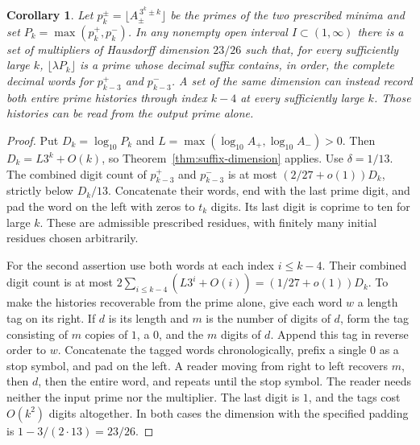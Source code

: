 \documentclass[11pt]{article}
\newtheorem{corollary}[theorem]{Corollary}
\theoremstyle{remark}\newtheorem*{remark}{Remark}
\begin{document}
\begin{corollary}\label{cor:both-prime-histories}
Let $p_k^\pm=\lfloor A_\pm^{\,3^k\pm k}\rfloor$ be the primes of the two
prescribed minima and set $P_k=\max(p_k^+,p_k^-)$. In any nonempty open
interval $I\subset(1,\infty)$ there is a set of multipliers of Hausdorff
dimension $23/26$ such that, for every sufficiently large $k$,
$\lfloor\lambda P_k\rfloor$ is a prime whose decimal suffix contains,
in order, the complete decimal words for $p_{k-3}^+$ and $p_{k-3}^-$.
A set of the same dimension can instead record both entire prime
histories through index $k-4$ at every sufficiently large $k$. Those
histories can be read from the output prime alone.
\end{corollary}

\begin{proof}
Put $D_k=\log_{10}P_k$ and $L=\max(\log_{10} A_+,\log_{10} A_-)>0$.
Then $D_k=L3^k+O(k)$, so Theorem~\ref{thm:suffix-dimension} applies.
Use $\delta=1/13$. The combined digit count of $p_{k-3}^+$ and $p_{k-3}^-$
is at most $(2/27+o(1))D_k$, strictly below $D_k/13$. Concatenate
their words, end with the last prime digit, and pad the word on the left
with zeros to $t_k$ digits. Its last digit is coprime to ten for large
$k$. These are admissible prescribed residues, with finitely many
initial residues chosen arbitrarily.

For the second assertion use both words at each index $i\le k-4$.
Their combined digit count is at most
$2\sum_{i\le k-4}(L3^i+O(i))=(1/27+o(1))D_k$.
To make the histories recoverable from the prime alone, give each word
$w$ a length tag on its right. If $d$ is its length and $m$ is the
number of digits of $d$, form the tag consisting of $m$ copies of $1$,
a $0$, and the $m$ digits of $d$. Append this tag in reverse order to
$w$. Concatenate the tagged words chronologically, prefix a single $0$
as a stop symbol, and pad on the left. A reader moving from right to
left recovers $m$, then $d$, then the entire word, and repeats until
the stop symbol. The reader needs neither the input prime nor the
multiplier. The last digit is $1$, and the tags cost $O(k^2)$ digits
altogether. In both cases the
dimension with the specified padding is $1-3/(2\cdot13)=23/26$.
\end{proof}
\end{document}

